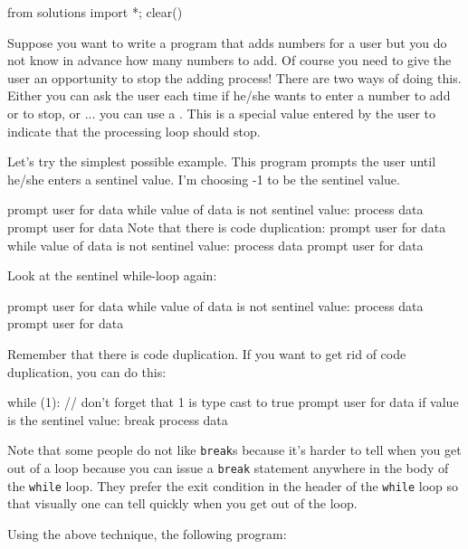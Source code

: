 \begin{python0}
from solutions import *; clear()
\end{python0}

Suppose you want to write a program that adds numbers for a user but you
do not know in advance how many numbers to add. Of course you need to
give the user an opportunity to stop the adding process! There are two
ways of doing this. Either you can ask the user each time if he/she
wants to enter a number to add or to stop, or ... you can use a
. This is a special value entered by the user to
indicate that the processing loop should stop.

Let's try the simplest possible example. This program
prompts the user until he/she enters a sentinel value.
I'm choosing -1 to be the sentinel value.


prompt user for data
while value of data is not sentinel value:
process data
prompt user for data
Note that there is code duplication:
prompt user for data
while value of data is not sentinel value:
process data
prompt user for data


Look at the sentinel while-loop again:

prompt user for data
while value of data is not sentinel value:
process data
prompt user for data

Remember that there is code duplication. If you want to get rid of code
duplication, you can do this:

while (1): // don't forget that 1 is type cast to true
prompt user for data
if value is the sentinel value:
break
process data

Note that some people do not like \texttt{break}s because
it's harder to tell when you get out of a loop because
you can issue a \texttt{break} statement anywhere in the body of the
\texttt{while} loop. They prefer the exit condition in the header of the
\texttt{while} loop so that visually one can tell quickly when you get out
of the loop.

Using the above technique, the following program:

